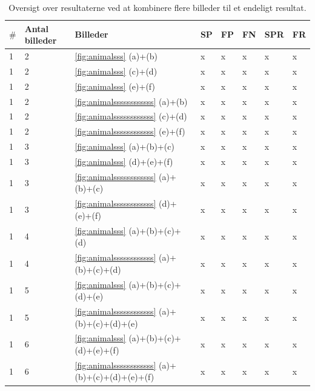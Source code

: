 \begin{table}
	\begin{tabular}{l|l|l|l|l|l|l|l}
		$\#$ & Antal billeder & Billeder & SP & FP & FN & SPR & FR \\\hline
		1	&	2	&	\ref{fig:animalsss} (a)+(b)	& x	& x	&x 	&x 	&x\\\hline
		1	&	2	&	\ref{fig:animalsss} (c)+(d)	& x	& x	&x 	&x 	&x\\\hline
		1	&	2	&	\ref{fig:animalsss} (e)+(f)	& x	& x	&x 	&x 	&x\\\hline
		1	&	2	&	\ref{fig:animalssssssssssss} (a)+(b)	& x	& x	&x 	&x 	&x\\\hline
		1	&	2	&	\ref{fig:animalssssssssssss} (c)+(d)	& x	& x	&x 	&x 	&x\\\hline
		1	&	2	&	\ref{fig:animalssssssssssss} (e)+(f)	& x	& x	&x 	&x 	&x\\\hline
		1	&	3	&	\ref{fig:animalsss} (a)+(b)+(c)	& x	& x	&x 	&x 	&x\\\hline
		1	&	3	&	\ref{fig:animalsss} (d)+(e)+(f)	& x	& x	&x 	&x 	&x\\\hline
		1	&	3	&	\ref{fig:animalssssssssssss} (a)+(b)+(c)	& x	& x	&x 	&x 	&x\\\hline
		1	&	3	&	\ref{fig:animalssssssssssss} (d)+(e)+(f)	& x	& x	&x 	&x 	&x\\\hline
		1	&	4	&	\ref{fig:animalsss} (a)+(b)+(c)+(d)	& x	& x	&x 	&x 	&x\\\hline
		1	&	4	&	\ref{fig:animalssssssssssss} (a)+(b)+(c)+(d)	& x	& x	&x 	&x 	&x\\\hline
		1	&	5	&	\ref{fig:animalsss} (a)+(b)+(c)+(d)+(e)	& x	& x	&x 	&x 	&x\\\hline
		1	&	5	&	\ref{fig:animalssssssssssss} (a)+(b)+(c)+(d)+(e)	& x	& x	&x 	&x 	&x\\\hline
		1	&	6	&	\ref{fig:animalsss} (a)+(b)+(c)+(d)+(e)+(f)	& x	& x	&x 	&x 	&x\\\hline
		1	&	6	&	\ref{fig:animalssssssssssss} (a)+(b)+(c)+(d)+(e)+(f)	& x	& x	&x 	&x 	&x
	\end{tabular}
	\caption{Oversigt over resultaterne ved at kombinere flere billeder til et endeligt resultat.\label{tab:postmethod_tabel2222}}
\end{table}


